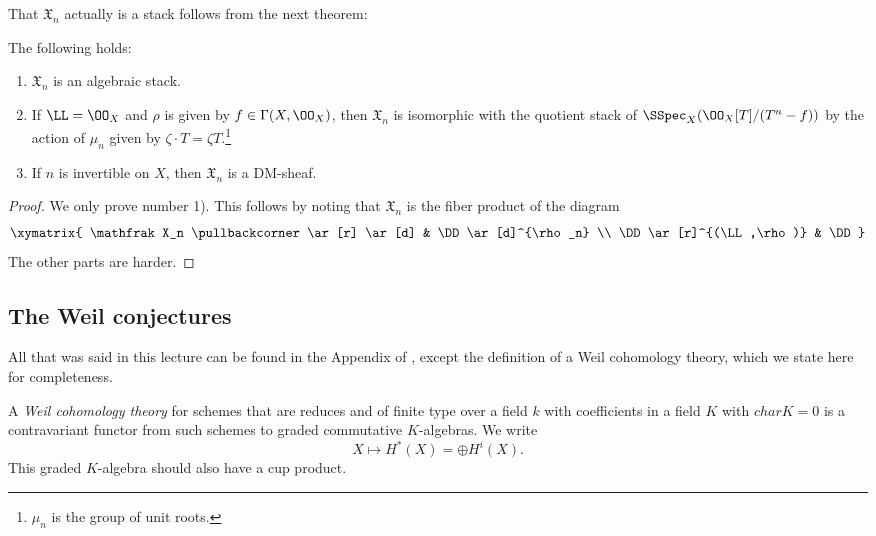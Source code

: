 \documentclass[11pt, english]{article}
\begin{document}
That $\mathfrak X_n$ actually is a stack follows from the next theorem:
\begin{thm}
The following holds:
\begin{enumerate}
\item $\mathfrak X_n$ is an algebraic stack.
\item If $\LL = \OO_X$ and $\rho$ is given by $ f \in \Gamma(X, \OO_X)$, then $\mathfrak X_n$ is isomorphic with the quotient stack of $\SSpec_X(\OO_X[T]/(T^n-f))$ by the action of $\mu_n$ given by $\zeta \cdot T = \zeta T$.\footnote{$\mu_n$ is the group of unit roots.}
\item If $n$ is invertible on $X$, then $\mathfrak X_n$ is a DM-sheaf.
\end{enumerate}
\end{thm}

\begin{proof}
We only prove number 1). This follows by noting that $\mathfrak X_n$ is the fiber product of the diagram
\[
\xymatrix{
\mathfrak X_n \pullbackcorner  \ar[r] \ar[d] & \DD \ar[d]^{\rho_n} \\
\DD \ar[r]^{(\LL,\rho)} & \DD
}
\]
The other parts are harder.
\end{proof}

\subsection{The Weil conjectures}

All that was said in this lecture can be found in the Appendix of \cite{hartshorne}, except the definition of a Weil cohomology theory, which we state here for completeness.

A \emph{Weil cohomology theory} for schemes that are reduces and of finite type over a field $k$ with coefficients in a field $K$ with $char K =0$ is a contravariant functor from such schemes to graded commutative $K$-algebras. We write
\[
X \mapsto H^\ast(X) = \oplus H^i(X).
\]
This graded $K$-algebra should also have a cup product.
\end{document}
